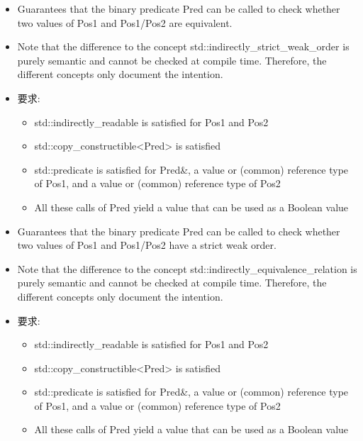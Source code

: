 \begin{itemize}
\item
Guarantees that the binary predicate Pred can be called to check whether two values of Pos1 and Pos1/Pos2 are equivalent.

\item
Note that the difference to the concept std::indirectly\_strict\_weak\_order is purely semantic and cannot be checked at compile time. Therefore, the different concepts only document the intention.

\item
要求:
\begin{itemize}
\item
std::indirectly\_readable is satisfied for Pos1 and Pos2

\item
std::copy\_constructible<Pred> is satisfied

\item
std::predicate is satisfied for Pred\&, a value or (common) reference type of Pos1, and a value or (common) reference type of Pos2

\item
All these calls of Pred yield a value that can be used as a Boolean value
\end{itemize}
\end{itemize}


\begin{itemize}
\item
Guarantees that the binary predicate Pred can be called to check whether two values of Pos1 and Pos1/Pos2 have a strict weak order.

\item
Note that the difference to the concept std::indirectly\_equivalence\_relation is purely semantic and cannot be checked at compile time. Therefore, the different concepts only document the intention.

\item
要求:
\begin{itemize}
\item
std::indirectly\_readable is satisfied for Pos1 and Pos2

\item
std::copy\_constructible<Pred> is satisfied

\item
std::predicate is satisfied for Pred\&, a value or (common) reference type of Pos1, and a value or (common) reference type of Pos2

\item
All these calls of Pred yield a value that can be used as a Boolean value
\end{itemize}
\end{itemize}










